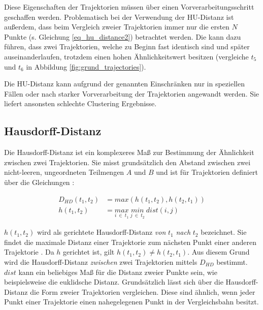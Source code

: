 Diese Eigenschaften der Trajektorien müssen über einen Vorverarbeitungsschritt geschaffen werden.
Problematisch bei der Verwendung der HU-Distanz ist außerdem, dass beim Vergleich zweier Trajektorien immer nur
die ersten $N$ Punkte (s. Gleichung \ref{eq_hu_distance2}) betrachtet werden. Die kann dazu führen, dass zwei
Trajektorien, welche zu Beginn fast identisch sind und später auseinanderlaufen, trotzdem einen hohen Ähnlichkeitswert besitzen
(vergleiche $t_5$ und $t_6$ in Abbildung \ref{fig:grund_trajectories}).

Die HU-Distanz kann aufgrund der genannten Einschränken nur in speziellen Fällen oder nach starker Vorverarbeitung
der Trajektorien angewandt werden. Sie liefert ansonsten schlechte Clustering Ergebnisse.

\subsection{Hausdorff-Distanz}
\label{sec:hausdorff_distance}

Die Hausdorff-Distanz ist ein komplexeres Maß zur Bestimmung der Ähnlichkeit zwischen zwei Trajektorien.
Sie misst grundsätzlich den Abstand zwischen zwei nicht-leeren, ungeordneten Teilmengen $A$ und $B$ und ist für
Trajektorien definiert über die Gleichungen \cite[]{Atev2010}:

\begin{ceqn}
\begin{align}
\label{eq_hausdorff1}
    D_{HD}(t_1, t_2) &= max(h(t_1, t_2), h(t_2, t_1)) \\
\label{eq_hausdorff2}
    h(t_1, t_2) &= \underset{i\ \in\ t_1}{max}\ \underset{j\ \in\ t_2}{min}\ dist(i, j)
\end{align}
\end{ceqn}

$h(t_1, t_2)$ wird als gerichtete Hausdorff-Distanz \textit{von} $t_1$ \textit{nach} $t_2$ bezeichnet.
Sie findet die maximale Distanz einer Trajektorie zum nächsten Punkt einer anderen Trajektorie \cite[]{Huttenlocher}.
Da $h$ gerichtet ist, gilt $h(t_1, t_2) \neq h(t_2, t_1)$. Aus diesem Grund wird die Hausdorff-Distanz
\textit{zwischen} zwei Trajektorien mittels $D_{HD}$ bestimmt. $dist$ kann ein beliebiges Maß für die Distanz zweier
Punkte sein, wie beispielsweise die euklidsche Distanz.
Grundsätzlich lässt sich über die Hausdorff-Distanz die Form zweier Trajektorien vergleichen. Diese sind ähnlich,
wenn jeder Punkt einer Trajektorie einen nahegelegenen Punkt in der Vergleichsbahn besitzt.


